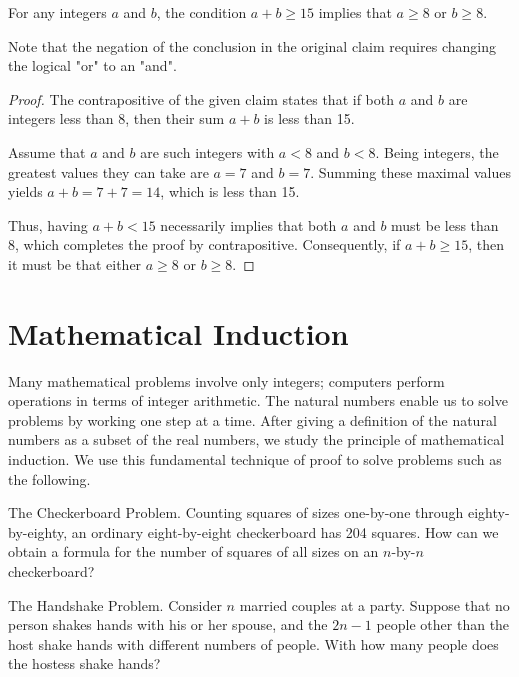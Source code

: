 \documentclass[
	12pt, %
	fleqn, %
	a4paper, %
]{LegrandOrangeBook}
\begin{document}
\begin{exercise}
For any integers \( a \) and \( b \), the condition \( a + b \geq 15 \) implies that \( a \geq 8 \) or \( b \geq 8 \).
\end{exercise}
\begin{remark}
    Note that the negation of the conclusion in the original claim requires changing the logical "or" to an "and".
\end{remark}
\begin{proof}
The contrapositive of the given claim states that if both \( a \) and \( b \) are integers less than 8, then their sum \( a + b \) is less than 15.

Assume that \( a \) and \( b \) are such integers with \( a < 8 \) and \( b < 8 \). Being integers, the greatest values they can take are \( a = 7 \) and \( b = 7 \). Summing these maximal values yields \( a + b = 7 + 7 = 14 \), which is less than 15.

Thus, having \( a + b < 15 \) necessarily implies that both \( a \) and \( b \) must be less than 8, which completes the proof by contrapositive. Consequently, if \( a + b \geq 15 \), then it must be that either \( a \geq 8 \) or \( b \geq 8 \).


\end{proof}
\section{Mathematical Induction}

Many mathematical problems involve only integers; computers perform operations in terms of integer arithmetic. The natural numbers enable us to solve problems by working one step at a time. After giving a definition of the natural numbers as a subset of the real numbers, we study the principle of mathematical induction. We use this fundamental technique of proof to solve problems such as the following.

\begin{problem}
The Checkerboard Problem. Counting squares of sizes one-by-one through eighty-by-eighty, an ordinary eight-by-eight checkerboard has 204 squares. How can we obtain a formula for the number of squares of all sizes on an \( n \)-by-\( n \) checkerboard?
\end{problem}

\begin{problem}
The Handshake Problem. Consider \( n \) married couples at a party. Suppose that no person shakes hands with his or her spouse, and the \( 2n - 1 \) people other than the host shake hands with different numbers of people. With how many people does the hostess shake hands?
\end{problem}
\end{document}
